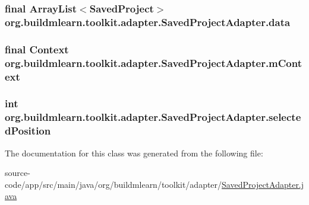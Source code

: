 \subsubsection[{\texorpdfstring{data}{data}}]{\setlength{\rightskip}{0pt plus 5cm}final Array\+List$<${\bf Saved\+Project}$>$ org.\+buildmlearn.\+toolkit.\+adapter.\+Saved\+Project\+Adapter.\+data\hspace{0.3cm}{\ttfamily [private]}}\hypertarget{classorg_1_1buildmlearn_1_1toolkit_1_1adapter_1_1SavedProjectAdapter_aff22bb73e6dc24e2416b65607365230f}{}\label{classorg_1_1buildmlearn_1_1toolkit_1_1adapter_1_1SavedProjectAdapter_aff22bb73e6dc24e2416b65607365230f}
\subsubsection[{\texorpdfstring{m\+Context}{mContext}}]{\setlength{\rightskip}{0pt plus 5cm}final Context org.\+buildmlearn.\+toolkit.\+adapter.\+Saved\+Project\+Adapter.\+m\+Context\hspace{0.3cm}{\ttfamily [private]}}\hypertarget{classorg_1_1buildmlearn_1_1toolkit_1_1adapter_1_1SavedProjectAdapter_a1fd3cc434700fb304d3d0b6b821eaf55}{}\label{classorg_1_1buildmlearn_1_1toolkit_1_1adapter_1_1SavedProjectAdapter_a1fd3cc434700fb304d3d0b6b821eaf55}
\subsubsection[{\texorpdfstring{selected\+Position}{selectedPosition}}]{\setlength{\rightskip}{0pt plus 5cm}int org.\+buildmlearn.\+toolkit.\+adapter.\+Saved\+Project\+Adapter.\+selected\+Position\hspace{0.3cm}{\ttfamily [private]}}\hypertarget{classorg_1_1buildmlearn_1_1toolkit_1_1adapter_1_1SavedProjectAdapter_aabfa505b7e2443686bf6c8e1ab1f65b8}{}\label{classorg_1_1buildmlearn_1_1toolkit_1_1adapter_1_1SavedProjectAdapter_aabfa505b7e2443686bf6c8e1ab1f65b8}


The documentation for this class was generated from the following file\+:\begin{DoxyCompactItemize}
\item 
source-\/code/app/src/main/java/org/buildmlearn/toolkit/adapter/\hyperlink{SavedProjectAdapter_8java}{Saved\+Project\+Adapter.\+java}\end{DoxyCompactItemize}
